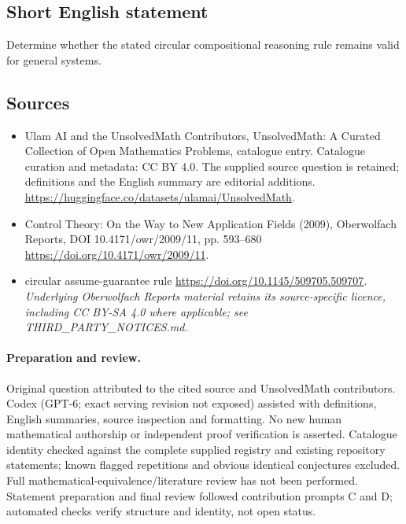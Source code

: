 \documentclass[11pt]{article}
\begin{document}
\subsection{Short English statement}
Determine whether the stated circular compositional reasoning rule remains valid for general systems.
\subsection{Sources}
\begin{itemize}
\item[\hypertarget{source:statement:1}{S1}] Ulam AI and the UnsolvedMath Contributors, UnsolvedMath: A Curated Collection of Open Mathematics Problems, catalogue entry. Catalogue curation and metadata: CC BY 4.0. The supplied source question is retained; definitions and the English summary are editorial additions.
\url{https://huggingface.co/datasets/ulamai/UnsolvedMath}.
\item[\hypertarget{source:statement:2}{S2}] Control Theory: On the Way to New Application Fields (2009), Oberwolfach Reports, DOI 10.4171/owr/2009/11, pp. 593--680
\url{https://doi.org/10.4171/owr/2009/11}.
\item[\hypertarget{source:statement:3}{S3}] circular assume-guarantee rule
\url{https://doi.org/10.1145/509705.509707}.
\textit{Underlying Oberwolfach Reports material retains its source-specific licence, including CC BY-SA 4.0 where applicable; see THIRD\_PARTY\_NOTICES.md.}
\end{itemize}
\paragraph{Preparation and review.}
Original question attributed to the cited source and UnsolvedMath contributors. Codex (GPT-6; exact serving revision not exposed) assisted with definitions, English summaries, source inspection and formatting. No new human mathematical authorship or independent proof verification is asserted. Catalogue identity checked against the complete supplied registry and existing repository statements; known flagged repetitions and obvious identical conjectures excluded. Full mathematical-equivalence/literature review has not been performed. Statement preparation and final review followed contribution prompts C and D; automated checks verify structure and identity, not open status.
\label{end:statement}
\end{document}
